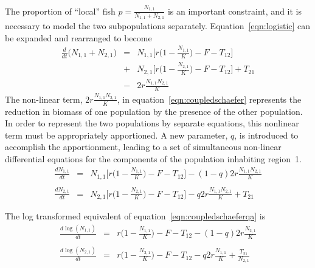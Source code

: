 \documentclass[12pt,letterpaper,twoside]{article}
\newcommand\None{{N_{1,1}}}
\newcommand\Ntwo{{N_{2,1}}}
\newcommand\Nsum{{N_{1,1}+N_{2,1}}}
\begin{document}
The proportion of ``local'' fish $p = \frac{\None}{\Nsum}$ is an
important constraint, and it is necessary to model the two
subpopulations separately.
Equation~\ref{eqn:logistic} can be expanded and rearranged to become
\begin{eqnarray}
\label{eqn:coupledschaefer}
\frac{d}{dt}\big(\Nsum\big) &=&\None\Big[r\Big(1-\frac{\None}{K}\Big)
-F - T_{12}\Big] \nonumber\\
&+&\Ntwo\Big[r\Big(1-\frac{\Ntwo}{K}\Big)
-F - T_{12}\Big]  + T_{21}\\
&-& 2r\frac{\None\Ntwo}{K}\nonumber
\end{eqnarray}
The non-linear term, $2r\frac{\None\Ntwo}{K}$, in
equation~\ref{eqn:coupledschaefer} represents the reduction in biomass
of one population by the presence of the other population.
In order to represent
the two populations by separate equations, this
nonlinear term must be appropriately apportioned.
A new parameter, $q$, is introduced to accomplish the apportionment,
leading to a set of simultaneous non-linear differential equations for
the components of the population inhabiting region~1.
\begin{eqnarray}
\label{eqn:coupledschaeferqa}
\frac{d\None}{dt}&=&\None\Big[r\Big(1-\frac{\None}{K}\Big)
-F - T_{12}\Big] - (1-q)2r\frac{\None\Ntwo}{K}\nonumber\\
\\
\frac{d\Ntwo}{dt}&=&\Ntwo\Big[r\Big(1-\frac{\Ntwo}{K}\Big)
-F - T_{12}\Big] - q2r\frac{\None\Ntwo}{K} + T_{21}\nonumber
\end{eqnarray}

The log transformed equivalent of equation~\ref{eqn:coupledschaeferqa} is
\begin{eqnarray}
\label{eqn:coupledlogschaefer}
\frac{d\log(\None)}{dt}&=&r\Big(1-\frac{\None}{K}\Big) -F - T_{12} -
(1-q)2r\frac{\Ntwo}{K}\nonumber\\
\\
\frac{d\log(\Ntwo)}{dt}&=&r\Big(1-\frac{\Ntwo}{K}\Big) -F - T_{12} -
q2r\frac{\None}{K} + \frac{T_{21}}{\Ntwo}\nonumber
\end{eqnarray}
\end{document}
